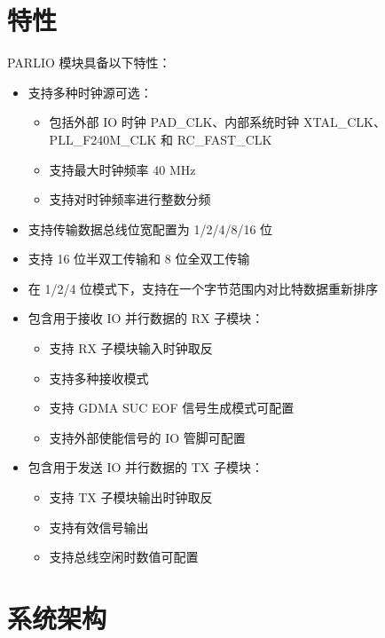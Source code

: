 \documentclass[main\_\_CN.tex]{subfiles}
\begin{document}

\section{特性}
\label{sec:parlio-features}

PARLIO 模块具备以下特性：

\begin{itemize}
    \item 支持多种时钟源可选：
    \begin{itemize}
        \item 包括外部 IO 时钟 PAD\_CLK、内部系统时钟 XTAL\_CLK、PLL\_F240M\_CLK 和 RC\_FAST\_CLK
        \item 支持最大时钟频率 40 MHz
        \item 支持对时钟频率进行整数分频
    \end{itemize}
    \item 支持传输数据总线位宽配置为 1/2/4/8/16 位
    \item 支持 16 位半双工传输和 8 位全双工传输
    \item 在 1/2/4 位模式下，支持在一个字节范围内对比特数据重新排序
    \item 包含用于接收 IO 并行数据的 RX 子模块：
    \begin{itemize}
        \item 支持 RX 子模块输入时钟取反
        \item 支持多种接收模式
        \item 支持 GDMA SUC EOF 信号生成模式可配置
        \item 支持外部使能信号的 IO 管脚可配置
    \end{itemize}
    \item 包含用于发送 IO 并行数据的 TX 子模块：
    \begin{itemize}
        \item 支持 TX 子模块输出时钟取反
        \item 支持有效信号输出
        \item 支持总线空闲时数值可配置
    \end{itemize}

\end{itemize}



\section{系统架构}
\label{sec:parlio-arch-overview}
\end{document}
